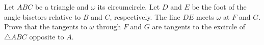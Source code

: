 Let $ABC$ be a triangle and $\omega$ its circumcircle. Let $D$ and $E$ be the foot of the angle bisctors relative to $B$ and $C$, respectively. The line $DE$ meets $\omega$ at $F$ and $G$. Prove that the tangents to $\omega$ through $F$ and $G$ are tangents to the excircle of  $\triangle ABC$ opposite to $A$.